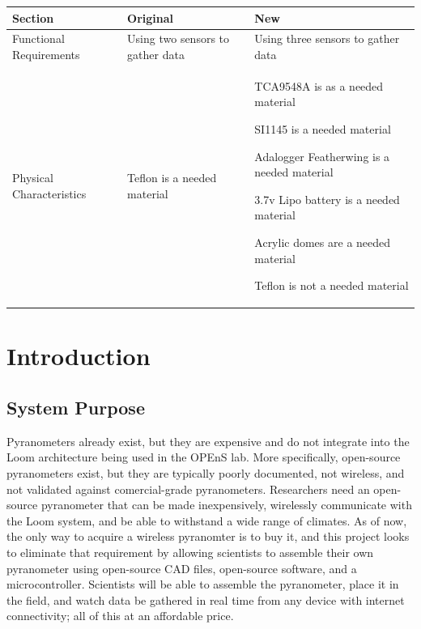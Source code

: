 \documentclass[10pt,draftclsnofoot,onecolumn,letterpaper]{article}
\begin{document}
\setlength{\arrayrulewidth}{1mm}
\setlength{\tabcolsep}{20pt}
\renewcommand{\arraystretch}{2}
{
\begin{table}[h]
\begin{tabular}{ |p{4cm}|p{3cm}|p{7cm}|  }
\hline
Section & Original & New \\
\hline
Functional Requirements
& 
Using two sensors to gather data
& 
Using three sensors to gather data \\
\hline
Physical Characteristics
&
Teflon is a needed material
&
\begin{tabitem}
    \item TCA9548A is as a needed material 
    \item SI1145 is a needed material 
    \item Adalogger Featherwing is a needed material
    \item 3.7v Lipo battery is a needed material
    \item Acrylic domes are a needed material
    \item Teflon is not a needed material
\end{tabitem}
\tabularnewline
\hline
\end{tabular}
\end{table}
}

\newpage
    
    
\section{Introduction}
\subsection{System Purpose}
Pyranometers already exist, but they are expensive and do not integrate into the Loom architecture being used in the OPEnS lab. More specifically, open-source pyranometers exist, but they are typically poorly documented, not wireless, and not validated against comercial-grade pyranometers. Researchers need an open-source pyranometer that can be made inexpensively, wirelessly communicate with the Loom system, and be able to withstand a wide range of climates. As of now, the only way to acquire a wireless pyranomter is to buy it, and this project looks to eliminate that requirement by allowing scientists to assemble their own pyranometer using open-source CAD files, open-source software, and a microcontroller. Scientists will be able to assemble the pyranometer, place it in the field, and watch data be gathered in real time from any device with internet connectivity; all of this at an affordable price.  
\end{document}
